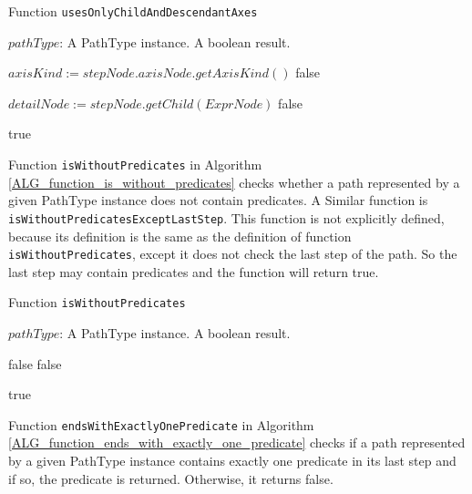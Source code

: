 \begin{algorithm}
\caption{Function \texttt{usesOnlyChildAndDescendantAxes}}
\label{ALG_function_uses_only_child_and_descendant_axes}
\begin{algorithmic}[1]
\REQUIRE $pathType$: A PathType instance.
\ENSURE A boolean result.

		\STATE $axisKind := stepNode.axisNode.getAxisKind()$
			\RETURN false
		\ENDIF
	\ENDIF
\ENDFOR

\STATE $detailNode := stepNode.getChild(ExprNode)$
			\RETURN false
		\ENDIF
	\ENDIF
\ENDIF

\RETURN true
\end{algorithmic}
\end{algorithm}

Function \texttt{isWithoutPredicates} in Algorithm \ref{ALG_function_is_without_predicates} checks whether a path represented by a given PathType instance does not contain predicates. A Similar function is  \texttt{isWithoutPredicatesExceptLastStep}. This function is not explicitly defined, because its definition is the same as the definition of function \texttt{isWithoutPredicates}, except it does not check the last step of the path. So the last step may contain predicates and the function will return true.

\begin{algorithm}
\caption{Function \texttt{isWithoutPredicates}}
\label{ALG_function_is_without_predicates}
\begin{algorithmic}[1]
\REQUIRE $pathType$: A PathType instance.
\ENSURE A boolean result.

		\RETURN false
	\ENDIF
			\RETURN false
		\ENDIF
	\ENDIF
\ENDFOR

\RETURN true
\end{algorithmic}
\end{algorithm}

Function \texttt{endsWithExactlyOnePredicate} in Algorithm \ref{ALG_function_ends_with_exactly_one_predicate} checks if a path represented by a given PathType instance contains exactly one predicate in its last step and if so, the predicate is returned. Otherwise, it returns false.


